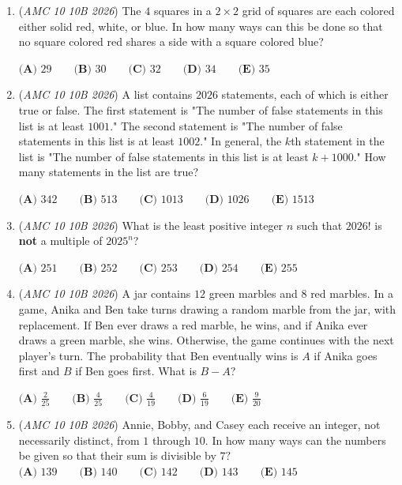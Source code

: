 \begin{enumerate}
 $\textbf{(A) } \frac{1}{4} \qquad \textbf{(B) } \frac{1}{3} \qquad \textbf{(C) } \frac{1}{2} \qquad \textbf{(D) } \frac{2}{3} \qquad \textbf{(E) } \frac{3}{4}$


	\item (\textit{AMC 10 10B 2026}) The $4$ squares in a $2 \times 2$ grid of squares are each colored either solid red, white, or blue. In how many ways can this be done so that no square colored red shares a side with a square colored blue?


 $\textbf{(A) } 29 \qquad \textbf{(B) } 30 \qquad \textbf{(C) } 32 \qquad \textbf{(D) } 34 \qquad \textbf{(E) } 35$


	\item (\textit{AMC 10 10B 2026}) A list contains $2026$ statements, each of which is either true or false. The first statement is "The number of false statements in this list is at least $1001$." The second statement is "The number of false statements in this list is at least $1002$." In general, the $k$th statement in the list is "The number of false statements in this list is at least $k + 1000$." How many statements in the list are true?


 $\textbf{(A) } 342 \qquad \textbf{(B) } 513 \qquad \textbf{(C) } 1013 \qquad \textbf{(D) } 1026 \qquad \textbf{(E) } 1513$


	\item (\textit{AMC 10 10B 2026}) What is the least positive integer $n$ such that $2026!$ is \textbf{not} a multiple of $2025^n$?


 $\textbf{(A) }251 \qquad \textbf{(B) }252 \qquad \textbf{(C) }253 \qquad \textbf{(D) }254 \qquad \textbf{(E) }255$


	\item (\textit{AMC 10 10B 2026}) A jar contains $12$ green marbles and $8$ red marbles. In a game, Anika and Ben take turns drawing a random marble from the jar, with replacement. If Ben ever draws a red marble, he wins, and if Anika ever draws a green marble, she wins. Otherwise, the game continues with the next player's turn. The probability that Ben eventually wins is $A$ if Anika goes first and $B$ if Ben goes first. What is $B - A$?


 $\textbf{(A) }\frac{2}{25} \qquad \textbf{(B) }\frac{4}{25} \qquad \textbf{(C) }\frac{4}{19} \qquad \textbf{(D) }\frac{6}{19} \qquad \textbf{(E) }\frac{9}{20}$


	\item (\textit{AMC 10 10B 2026}) Annie, Bobby, and Casey each receive an integer, not necessarily distinct, from $1$ through $10.$ In how many ways can the numbers be given so that their sum is divisible by $7?$
$\textbf{(A) } 139 \qquad \textbf{(B) } 140 \qquad \textbf{(C) } 142 \qquad \textbf{(D) } 143 \qquad \textbf{(E) } 145$



\end{enumerate}
